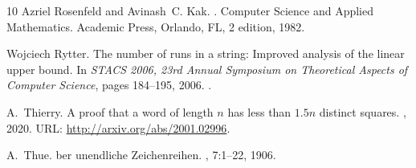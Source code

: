 \documentclass[11pt,letterpaper]{article}
\begin{document}
\begin{thebibliography}{10}
Azriel Rosenfeld and Avinash~C. Kak.
.
\newblock Computer Science and Applied Mathematics. Academic Press, Orlando,
  FL, 2 edition, 1982.

Wojciech Rytter.
\newblock The number of runs in a string: Improved analysis of the linear upper
  bound.
\newblock In {\em {STACS} 2006, 23rd Annual Symposium on Theoretical Aspects of
  Computer Science}, pages 184--195, 2006.
\newblock \href {https://doi.org/10.1007/11672142\_14}
  {}.

A.~Thierry.
\newblock A proof that a word of length $n$ has less than $1.5n$ distinct
  squares.
, 2020.
\newblock URL: \url{http://arxiv.org/abs/2001.02996}.

A.~Thue.
ber unendliche {Z}eichenreihen.
,
  7:1--22, 1906.

\end{thebibliography}
\end{document}
